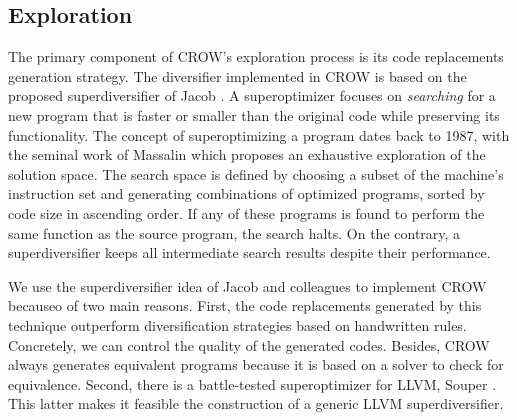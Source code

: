 
\subsection{Exploration}


The primary component of CROW's exploration process is its code replacements generation strategy. The diversifier implemented in CROW is based on the proposed superdiversifier of Jacob \etal \cite{jacob2008superdiversifier}.
A superoptimizer focuses on \emph{searching} for a new program that is faster or smaller than the original code while preserving its functionality.
The concept of superoptimizing a program dates back to 1987, with the seminal work of Massalin \cite{Massalin1987} which proposes an exhaustive exploration of the solution space. The search space is defined by choosing a subset of the machine's instruction set and generating combinations of optimized programs, sorted by code size in ascending order. If any of these programs is found to perform the same function as the source program, the search halts. On the contrary, a superdiversifier keeps all intermediate search results despite their performance. 

We use the superdiversifier idea of Jacob and colleagues to implement CROW becauseo of two main reasons.
First, the code replacements generated by this technique outperform diversification strategies based on handwritten rules. Concretely, we can control the quality of the generated codes. Besides, CROW always generates equivalent programs because it is based on a solver to check for equivalence. 
Second, there is a battle-tested superoptimizer for LLVM, Souper \cite{Sasnauskas2017Souper:Superoptimizer}. This latter makes it feasible the construction of a generic LLVM superdiversifier. 


